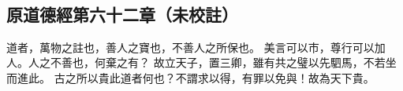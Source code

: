 ﻿%
%

\chapter{~}

\section{原道德經第六十二章（未校註）}

\begin{withgezhu}

\zhsong


道者，萬物之註也，\textcolor{tongjia-color}{善人之寶}也，不善人之所保也。
美言可以市，尊行可以加人。人之不善也，何棄之有？
故立天子，置三卿，雖有共之璧以先駟馬，不若坐而進此。
古之所以貴此道者何也？不謂求以得，有罪以免與！故為天下貴。

\end{withgezhu}
